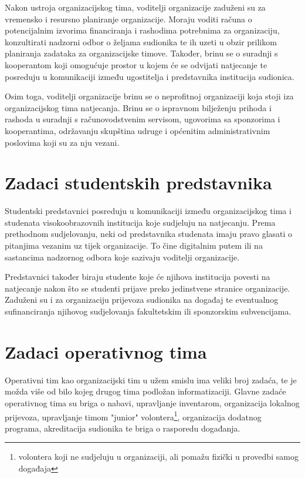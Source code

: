 \documentclass[times, utf8, diplomski]{fer}
\begin{document}
Nakon ustroja organizacijskog tima, voditelji organizacije zaduženi su za
vremensko i resursno planiranje organizacije. Moraju voditi računa o
potencijalnim izvorima financiranja i rashodima potrebnima za organizaciju,
konzultirati nadzorni odbor o željama sudionika te ih uzeti u obzir prilikom
planiranja zadataka za organizacijske timove. Također, brinu se o suradnji s
kooperantom koji omogućuje prostor u kojem će se odvijati natjecanje te
posreduju u komunikaciji između ugostitelja i predstavnika institucija
sudionica.

Osim toga, voditelji organizacije brinu se o neprofitnoj organizaciji koja stoji
iza organizacijskog tima natjecanja. Brinu se o ispravnom bilježenju prihoda i
rashoda u suradnji s računovodstvenim servisom, ugovorima sa sponzorima i
kooperantima, održavanju skupština udruge i općenitim administrativnim poslovima
koji su za nju vezani.

\section{Zadaci studentskih predstavnika}

Studentski predstavnici posreduju u komunikaciji između organizacijskog tima i
studenata visokoobrazovnih institucija koje sudjeluju na natjecanju. Prema
prethodnom sudjelovanju, neki od predstavnika studenata imaju pravo glasati o
pitanjima vezanim uz tijek organizacije. To čine digitalnim putem ili na
sastancima nadzornog odbora koje sazivaju voditelji organizacije.

Predstavnici također biraju studente koje će njihova institucija povesti na
natjecanje nakon što se studenti prijave preko jedinstvene stranice
organizacije. Zaduženi su i za organizaciju prijevoza sudionika na događaj te
eventualnog sufinanciranja njihovog sudjelovanja fakultetskim ili sponzorskim
subvencijama.

\section{Zadaci operativnog tima}

Operativni tim kao organizacijski tim u užem smislu ima veliki broj zadaća, te
je možda više od bilo kojeg drugog tima podložan informatizaciji. Glavne zadaće
operativnog tima su briga o nabavi, upravljanje inventarom, organizacija
lokalnog prijevoza, upravljanje timom "junior" volontera\footnote{volontera koji
    ne sudjeluju u organizaciji, ali pomažu fizički u provedbi samog događaja},
    organizacija dodatnog programa, akreditacija sudionika te briga o rasporedu
    događanja.
\end{document}

